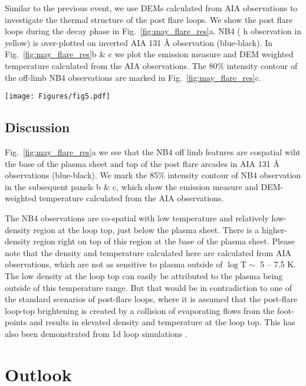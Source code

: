 Similar to the previous event, we use DEMs calculated from AIA observations to investigate the thermal structure of the post flare loops. We show the post flare loops during the decay phase in Fig.~\ref{fig:may_flare_res}a. {\suit} NB4 ( h observation in yellow) is over-plotted on inverted AIA 131 {\AA} observation (blue-black). In Fig.~\ref{fig:may_flare_res}b \& c we plot the emission measure and DEM weighted temperature calculated from the AIA observations. The 80\% intensity contour of the off-limb {\suit} NB4 observations are marked in Fig.~\ref{fig:may_flare_res}c. 

\begin{figure*}[ht!]
    \centering
    \texttt{[image: Figures/fig5.pdf]}
    \caption{(a) AIA 131 {\AA} observation in inverted colormap (blue-black), coaligned with {\suit} NB3 observation (yellow). (b) Calculated emission measure from the AIA observation. (c) Calculated DEM weighted temperature from the AIA observation.}
    \label{fig:may_flare_res}
\end{figure*}

\subsection{Discussion}\label{may27_dis}

Fig.~\ref{fig:may_flare_res}a we see that the {\suit} NB4 off limb features are cospatial wiht the base of the plasma sheet and top of the post flare arcades in AIA 131 {\AA} observations (blue-black). We mark the 85\% intensity contour of {\suit} NB4 observation in the subsequent panels b \& c, which show the emission measure and DEM-weighted temperature calculated from the AIA observations.

The {\suit} NB4 observations are co-spatial with low temperature and relatively low-density region at the loop top, just below the plasma sheet. There is a higher-density region right on top of this region at the base of the plasma sheet. Please note that the density and temperature calculated here are calculated from AIA observations, which are not as sensitive to plasma outside of $\log \mathrm{T} \sim$ 5 {--} 7.5 K. The low density at the loop top can easily be attributed to the plasma being outside of this temperature range. But that would be in contradiction to one of the standard scenarios of post-flare loops, where it is assumed that the post-flare loop-top brightening is created by a collision of evaporating flows from the foot-points and results in elevated density and temperature at the loop top. This has also been demonstrated from 1d loop simulations \citep{sharma16, reeves07}.

\section{Outlook}

